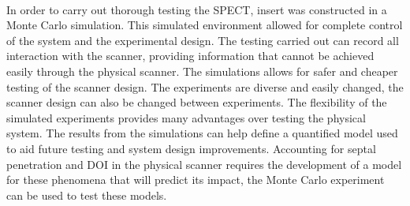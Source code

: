 \paragraph{}
In order to carry out thorough testing the SPECT, insert was constructed in a Monte Carlo simulation. This simulated environment allowed for complete control of the system and the experimental design. The testing carried out can record all interaction with the scanner, providing information that cannot be achieved easily through the physical scanner. The simulations allows for safer and cheaper testing of the scanner design. The experiments are diverse and easily changed, the scanner design can also be changed between experiments. The flexibility of the simulated experiments provides many advantages over testing the physical system. The results from the simulations can help define a quantified model used to aid future testing and system design improvements. Accounting for septal penetration and DOI in the physical scanner requires the development of a model for these phenomena that will predict its impact, the Monte Carlo experiment can be used to test these models. 
\blindtext
